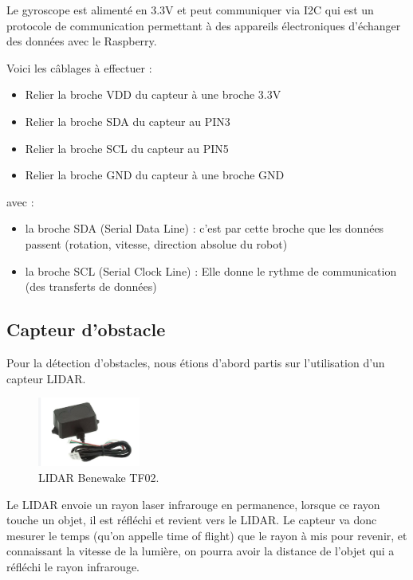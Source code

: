 \documentclass[a4paper,12pt]{report}  %
\begin{document}
Le gyroscope est alimenté en 3.3V et peut communiquer via I2C qui est un protocole de communication permettant à des appareils électroniques d’échanger des données avec le Raspberry. 

Voici les câblages à effectuer :

\begin{itemize}
	\item Relier la broche VDD du capteur à une broche 3.3V
	\item Relier la broche SDA du capteur au PIN3 
	\item Relier la broche SCL du capteur au PIN5 
	\item Relier la broche GND du capteur à une broche GND
\end{itemize}

avec : 

\begin{itemize}
	\item la broche SDA (Serial Data Line) : c’est par cette broche que les données passent (rotation, vitesse, direction absolue du robot)
	\item la broche SCL (Serial Clock Line) : Elle donne le rythme de communication (des transferts de données)
\end{itemize}

\subsection{Capteur d’obstacle}

Pour la détection d’obstacles, nous étions d’abord partis sur l’utilisation d’un capteur LIDAR.

\begin{figure}[H]
	\centering
	\includegraphics[width=0.3\textwidth]{./attachments/capteur_lidar.jpg}
	\caption{LIDAR Benewake TF02.}

\end{figure}


Le LIDAR envoie un rayon laser infrarouge en permanence, lorsque ce rayon touche un objet, il est réfléchi et revient vers le LIDAR. Le capteur va donc mesurer le temps (qu’on appelle time of flight) que le rayon à mis pour revenir, et connaissant la vitesse de la lumière, on pourra avoir la distance de l’objet qui a réfléchi le rayon infrarouge. 
\end{document}
